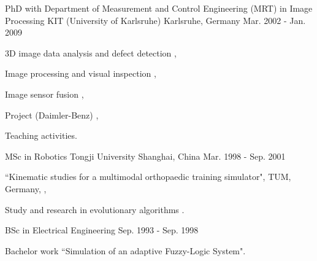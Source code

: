 \documentclass[../cv.tex]{subfiles}
\begin{document}
\begin{cventries}
  \cventry
    {PhD with Department of Measurement and Control Engineering (MRT) in Image Processing} %
    {KIT (University of Karlsruhe)} %
    {Karlsruhe, Germany} %
    {Mar. 2002 - Jan. 2009} %
    {
      \begin{cvitems} %
        \item 3D image data analysis and defect detection \supercite{xin2008diss},
        \item Image processing and visual inspection \supercite{xin2009multiscale} \supercite{xin2007evaluation},
        \item Image sensor fusion \supercite{xin2004bildfolgenauswertung},
        \item Project (Daimler-Benz) \supercite{Xin_Daimler_08},
        \item Teaching activities.
      \end{cvitems}
    }

  \cventry
    {MSc in Robotics} %
    {Tongji University} %
    {Shanghai, China} %
    {Mar. 1998 - Sep. 2001} %
    {
      \begin{cvitems} %
        \item ``Kinematic studies for a multimodal orthopaedic training simulator", TUM, Germany, \supercite{xin2002KneeSimulator},
        \item Study and research in evolutionary algorithms \supercite{xin2002AntColony}.
      \end{cvitems}
    }

  \cventry
    {BSc in Electrical Engineering} %
    {} %
    {} %
    {Sep. 1993 - Sep. 1998} %
    {
      \begin{cvitems} %
        \item Bachelor work ``Simulation of an adaptive Fuzzy-Logic System".
      \end{cvitems}
    }

\end{cventries}
\end{document}
